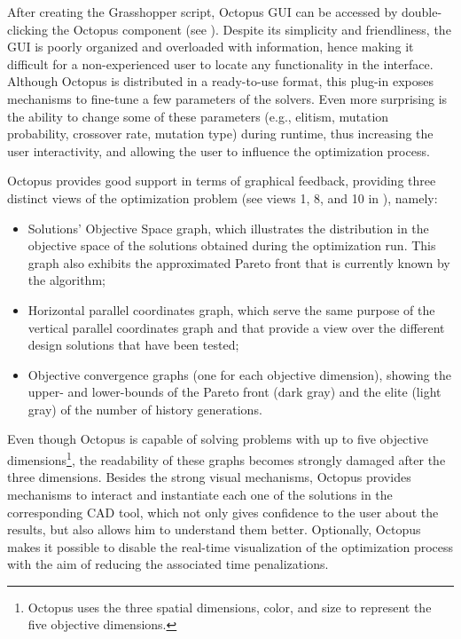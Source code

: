 After creating the Grasshopper script, Octopus \ac{GUI} can be accessed by double-clicking the Octopus component (see ). Despite its simplicity and friendliness, the \ac{GUI} is poorly organized and overloaded with information, hence making it difficult for a non-experienced user to locate any functionality in the interface. Although Octopus is distributed in a ready-to-use format, this plug-in exposes mechanisms to fine-tune a few parameters of the solvers. Even more surprising is the ability to change some of these parameters (e.g., elitism, mutation probability, crossover rate, mutation type) during runtime, thus increasing the user interactivity, and allowing the user to influence the optimization process.

Octopus provides good support in terms of graphical feedback, providing three distinct views of the optimization problem (see views 1, 8, and 10 in ), namely:
\begin{itemize}
	\item Solutions' Objective Space graph, which illustrates the distribution in the objective space of the solutions obtained during the optimization run. This graph also exhibits the approximated Pareto front that is currently known by the algorithm;
	\item Horizontal parallel coordinates graph, which serve the same purpose of the vertical parallel coordinates graph and that provide a view over the different design solutions that have been tested;
	\item Objective convergence graphs (one for each objective dimension), showing the upper- and lower-bounds of the Pareto front (dark gray) and the elite (light gray) of the number of history generations.
\end{itemize} 

Even though Octopus is capable of solving problems with up to five objective dimensions\footnote{Octopus uses the three spatial dimensions, color, and size to represent the five objective dimensions.}, the readability of these graphs becomes strongly damaged after the three dimensions. Besides the strong visual mechanisms, Octopus provides mechanisms to interact and instantiate each one of the solutions in the corresponding \ac{CAD} tool, which not only gives confidence to the user about the results, but also allows him to understand them better. Optionally, Octopus makes it possible to disable the real-time visualization of the optimization process with the aim of reducing the associated time penalizations.

